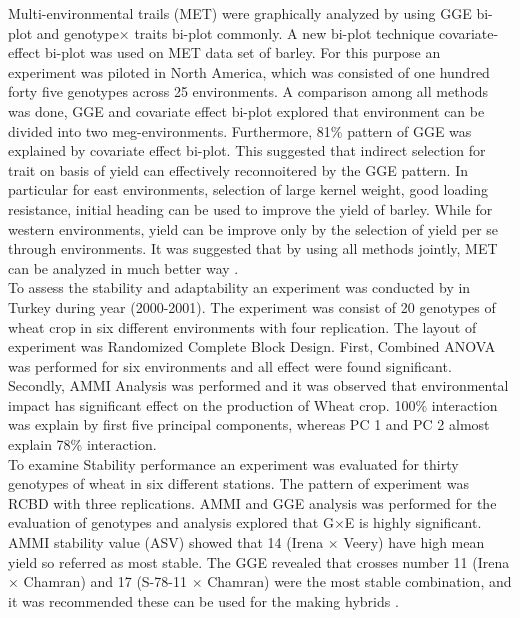 Multi-environmental trails (MET) were graphically analyzed by using GGE bi-plot and genotype$\times$ traits bi-plot commonly. A new bi-plot technique covariate-effect bi-plot was used on MET data set of barley. For this purpose an experiment was piloted in North America, which was consisted of one hundred forty five genotypes across 25 environments. A comparison among all methods was done, GGE and covariate effect bi-plot explored that environment can be divided into two meg-environments. Furthermore, 81\% pattern of GGE was explained by covariate effect bi-plot. This suggested that indirect selection for trait on basis of yield can effectively reconnoitered by the GGE pattern. In particular for east environments, selection of large kernel weight, good loading resistance, initial heading can be used to improve the yield of barley. While for western environments, yield can be improve only by the selection of yield per se through environments. It was suggested that by using all methods jointly, MET can be analyzed in much better way \citep{Yan2005}. \\

 To assess the stability and adaptability an experiment was conducted by \citep{KAYA2002} in Turkey during year (2000-2001).  The experiment was consist of 20 genotypes of wheat crop in six different environments with four replication. The layout of experiment was Randomized Complete Block Design. First, Combined ANOVA was performed for six environments and all effect were found significant. Secondly, AMMI Analysis was performed and it was observed that environmental impact has significant effect on the production of Wheat crop. 100\%  interaction was explain by first five principal components, whereas PC 1 and PC 2 almost explain 78\% interaction. \\ 
 
To examine Stability performance an experiment was evaluated for thirty genotypes of wheat in six different stations. The pattern of experiment was RCBD with three replications.  AMMI and GGE analysis was performed for the evaluation of genotypes and analysis explored that G$\times$E is highly significant. AMMI stability value (ASV) showed that 14 (Irena $\times$ Veery) have high mean yield so referred as most stable.  The GGE revealed that crosses number 11 (Irena $\times$ Chamran) and 17 (S-78-11 $\times$ Chamran) were the most stable combination, and it was recommended these can be used for  the making hybrids \citep{Rad2013}. \\
 
